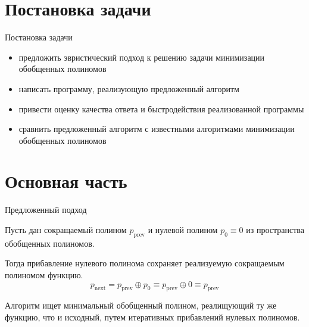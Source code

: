 \documentclass{beamer}
\begin{document}
\section{Постановка задачи}
\begin{frame}{Постановка задачи}

\begin{itemize}
    \item предложить эвристический подход к решению задачи минимизации обобщенных полиномов
    \item написать программу, реализующую предложенный алгоритм
    \item привести оценку качества ответа и быстродействия реализованной программы
    \item сравнить предложенный алгоритм с известными алгоритмами минимизации обобщенных полиномов
\end{itemize}

\end{frame}

\section{Основная часть}

\begin{frame}{Предложенный подход}

Пусть дан сокращаемый полином $ p_\mathrm{prev} $ и нулевой полином $ p_0 \equiv 0 $ из пространства обобщенных полиномов.

Тогда прибавление нулевого полинома сохраняет реализуемую сокращаемым полиномом функцию.
$$ p_\mathrm{next} = p_\mathrm{prev} \oplus p_0 \equiv p_\mathrm{prev} \oplus 0 \equiv p_\mathrm{prev} $$

Алгоритм ищет минимальный обобщенный полином, реалищующий ту же функцию, что и исходный, путем итеративных прибавлений нулевых полиномов.

\end{frame}
\end{document}
